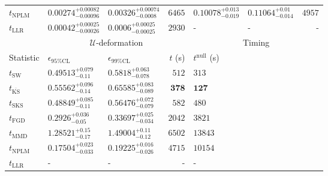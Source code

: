 \begin{tabular}{l|llr|llr}
\rowcolor{red!35}	$t_{\mathrm{NPLM}}$ & $0.00274_{-0.00096}^{+0.00082}$ & $0.00326_{-0.0008}^{+0.00074}$ & $6465$ & $0.10078_{-0.019}^{+0.013}$ & $0.11064_{-0.014}^{+0.01}$ & $4957$ \\
	$t_{\mathrm{LLR}}$ & $0.00042_{-0.00026}^{+0.00025}$ & $0.0006_{-0.00025}^{+0.00025}$ & $2930$ & - & - & - \\
	\toprule
	\multicolumn{1}{c}{} & \multicolumn{3}{c}{$\mathcal{U}$-deformation} & \multicolumn{3}{c}{Timing} \\
	Statistic & $\epsilon_{95\%\mathrm{CL}}$ & $\epsilon_{99\%\mathrm{CL}}$ & $t$ (s) & $t^{\mathrm{null}}$ (s) \\
	\midrule
	$t_{\mathrm{SW}}$ & $0.49513_{-0.11}^{+0.079}$ & $0.5818_{-0.078}^{+0.063}$ & $512$ & $313$ \\
	$t_{\overline{\mathrm{KS}}}$ & $0.55562_{-0.14}^{+0.096}$ & $0.65585_{-0.089}^{+0.083}$ & ${\mathbf{378}}$ & ${\mathbf{127}}$ \\
	$t_{\mathrm{SKS}}$ & $0.48849_{-0.11}^{+0.085}$ & $0.56476_{-0.079}^{+0.072}$ & $582$ & $480$ \\
	$t_{\mathrm{FGD}}$ & ${\mathbf{0.2926_{-0.05}^{+0.036}}}$ & ${\mathbf{0.33697_{-0.034}^{+0.025}}}$ & $2042$ & $3821$ \\
	$t_{\mathrm{MMD}}$ & $1.28521_{-0.17}^{+0.15}$ & $1.49004_{-0.12}^{+0.11}$ & $6502$ & $13843$ \\
\rowcolor{red!35}	$t_{\mathrm{NPLM}}$ & $0.17504_{-0.033}^{+0.023}$ & $0.19225_{-0.026}^{+0.016}$ & $4715$ & $10154$ \\
	$t_{\mathrm{LLR}}$ & - & - & - & - \\
	\bottomrule
\end{tabular}